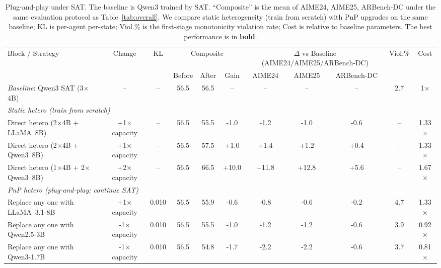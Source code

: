 \documentclass[sigconf]{aamas}
\begin{document}
\begin{table}[h!]
\centering
\captionsetup{font=small} 
\caption{Plug-and-play under SAT. The baseline is Qwen3 trained by SAT. ``Composite'' is the mean of {AIME24, AIME25, ARBench-DC} under the same evaluation protocol as Table~\ref{tab:overall}. We compare static heterogeneity (train from scratch) with PnP upgrades on the same baseline; KL is per-agent per-state; Viol.\% is the first-stage monotonicity violation rate; Cost is relative to baseline parameters. The best performance is in \textbf{bold}.}
\label{tab:plugin}

\small
\begin{tabular}{lcccccccccc}
\toprule
\multirow{2}{*}{Block / Strategy} & \multirow{2}{*}{Change} & \multirow{2}{*}{KL} & \multicolumn{3}{c}{Composite} & \multicolumn{3}{c}{$\Delta$ vs Baseline (AIME24/AIME25/ARBench-DC)} & \multirow{2}{*}{Viol.\%} & \multirow{2}{*}{Cost} \\
\cmidrule(lr){4-6}\cmidrule(lr){7-9}
 &  &  & Before & After & Gain & AIME24 & AIME25 & ARBench-DC &  &  \\
\midrule
\textit{Baseline}: Qwen3 SAT (3$\times$4B) & -- & -- & 56.5 & 56.5 & --   & --   & --   & --   & 2.7 & 1$\times$ \\
\midrule
\multicolumn{11}{l}{\textit{Static hetero (train from scratch)}} \\
Direct hetero (2$\times$4B + LLaMA~8B)            & +1$\times$ capacity & --    & 56.5 & 55.5 & -1.0 & -1.2 & -1.0 & -0.6 & --  & 1.33$\times$ \\
Direct hetero (2$\times$4B + Qwen3~8B)            & +1$\times$ capacity & --    & 56.5 & 57.5 & +1.0 & +1.4 & +1.2 & +0.4 & --  & 1.33$\times$ \\
Direct hetero (1$\times$4B + 2$\times$Qwen3~8B)   & +2$\times$ capacity & --    & 56.5 & 66.5 & +10.0& +11.8& +12.8& +5.6 & --  & 1.67$\times$ \\
\midrule
\multicolumn{11}{l}{\textit{PnP hetero (plug-and-play; continue SAT)}} \\
Replace any one with LLaMA~3.1-8B                 & +1$\times$ capacity & 0.010 & 56.5 & 55.9 & -0.6 & -0.8 & -0.6 & -0.2 & 4.7 & 1.33$\times$ \\
Replace any one with Qwen2.5-3B                   & -1$\times$ capacity & 0.010 & 56.5 & 55.5 & -1.0 & -1.2 & -1.2 & -0.6 & 3.9 & 0.92$\times$ \\
Replace any one with Qwen3-1.7B                   & -1$\times$ capacity & 0.010 & 56.5 & 54.8 & -1.7 & -2.2 & -2.2 & -0.6 & 3.7 & 0.81$\times$ \\

\end{tabular}
\end{table}
\end{document}
